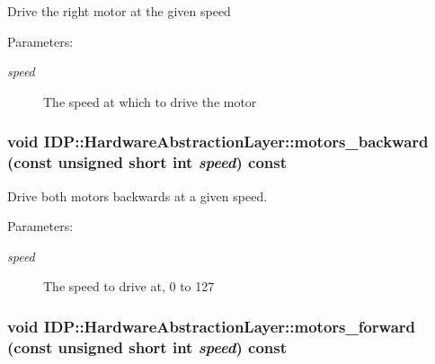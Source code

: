 Drive the right motor at the given speed \begin{Desc}
\item[Parameters:]
\begin{description}
\item[{\em speed}]The speed at which to drive the motor \end{description}
\end{Desc}
\hypertarget{classIDP_1_1HardwareAbstractionLayer_43a8ac2e89e101cd8976ce10401e6142}{
\subsubsection[{motors\_\-backward}]{\setlength{\rightskip}{0pt plus 5cm}void IDP::HardwareAbstractionLayer::motors\_\-backward (const unsigned short int {\em speed}) const}}
\label{classIDP_1_1HardwareAbstractionLayer_43a8ac2e89e101cd8976ce10401e6142}


Drive both motors backwards at a given speed. \begin{Desc}
\item[Parameters:]
\begin{description}
\item[{\em speed}]The speed to drive at, 0 to 127 \end{description}
\end{Desc}
\hypertarget{classIDP_1_1HardwareAbstractionLayer_0c5a7c42e881c0b4bf8b3f5497c1e4ca}{
\subsubsection[{motors\_\-forward}]{\setlength{\rightskip}{0pt plus 5cm}void IDP::HardwareAbstractionLayer::motors\_\-forward (const unsigned short int {\em speed}) const}}
\label{classIDP_1_1HardwareAbstractionLayer_0c5a7c42e881c0b4bf8b3f5497c1e4ca}


